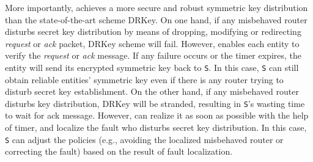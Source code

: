 More importantly, \namekey{} achieves a more secure and robust symmetric key distribution than the state-of-the-art scheme DRKey. On one hand, if any misbehaved router disturbs secret key distribution by means of dropping, modifying or redirecting \emph{request} or \emph{ack} packet, DRKey scheme will fail. However, \namekey{} enables each entity to verify the \emph{request} or \emph{ack} message. If any failure occurs or the timer expires, the entity will send its encrypted symmetric key back to {\tt S}. In this case, {\tt S} can still obtain reliable entities' symmetric key even if there is any router trying to disturb secret key establishment. On the other hand, if any misbehaved router disturbs key distribution, DRKey will be stranded, resulting in {\tt S}'s wasting time to wait for ack message. However, \namekey{} can realize it as soon as possible with the help of timer, and localize the fault who disturbs secret key distribution. In this case, {\tt S} can adjust the policies (e.g., avoiding the localized misbehaved router or correcting the fault) based on the result of fault localization.

